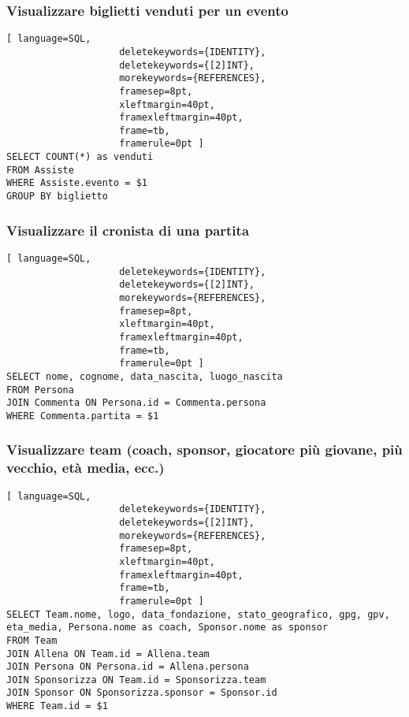 \documentclass{article}
\begin{document}
\subsubsection{Visualizzare biglietti venduti per un evento}
\begin{lstlisting}[ language=SQL,
                    deletekeywords={IDENTITY},
                    deletekeywords={[2]INT},
                    morekeywords={REFERENCES},
                    framesep=8pt,
                    xleftmargin=40pt,
                    framexleftmargin=40pt,
                    frame=tb,
                    framerule=0pt ]
SELECT COUNT(*) as venduti
FROM Assiste
WHERE Assiste.evento = $1
GROUP BY biglietto
\end{lstlisting}

\subsubsection{Visualizzare il cronista di una partita}
\begin{lstlisting}[ language=SQL,
                    deletekeywords={IDENTITY},
                    deletekeywords={[2]INT},
                    morekeywords={REFERENCES},
                    framesep=8pt,
                    xleftmargin=40pt,
                    framexleftmargin=40pt,
                    frame=tb,
                    framerule=0pt ]
SELECT nome, cognome, data_nascita, luogo_nascita
FROM Persona
JOIN Commenta ON Persona.id = Commenta.persona
WHERE Commenta.partita = $1
\end{lstlisting}

\subsubsection{Visualizzare team (coach, sponsor, giocatore più giovane, più vecchio, età media, ecc.)}
\begin{lstlisting}[ language=SQL,
                    deletekeywords={IDENTITY},
                    deletekeywords={[2]INT},
                    morekeywords={REFERENCES},
                    framesep=8pt,
                    xleftmargin=40pt,
                    framexleftmargin=40pt,
                    frame=tb,
                    framerule=0pt ]
SELECT Team.nome, logo, data_fondazione, stato_geografico, gpg, gpv, eta_media, Persona.nome as coach, Sponsor.nome as sponsor
FROM Team
JOIN Allena ON Team.id = Allena.team
JOIN Persona ON Persona.id = Allena.persona
JOIN Sponsorizza ON Team.id = Sponsorizza.team
JOIN Sponsor ON Sponsorizza.sponsor = Sponsor.id
WHERE Team.id = $1
\end{lstlisting}
\end{document}
